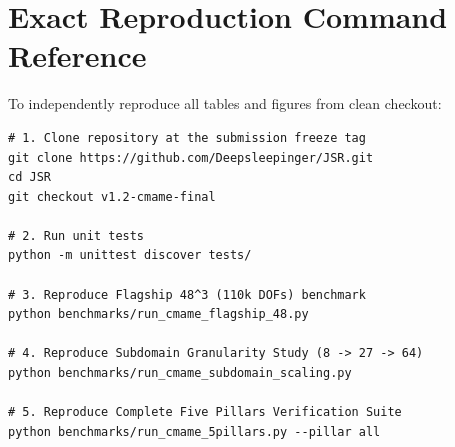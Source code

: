 \documentclass[11pt,a4paper]{article}
\begin{document}
\begin{table}[htbp]
\centering
\small
\caption{Subdomain granularity scaling across $N_{\text{sub}} \in \{8, 27, 64\}$ ($N=32$, 3 time steps).}
\label{tab:supp_granularity}
\end{table}

\section{Exact Reproduction Command Reference}
To independently reproduce all tables and figures from clean checkout:
\begin{verbatim}
# 1. Clone repository at the submission freeze tag
git clone https://github.com/Deepsleepinger/JSR.git
cd JSR
git checkout v1.2-cmame-final

# 2. Run unit tests
python -m unittest discover tests/

# 3. Reproduce Flagship 48^3 (110k DOFs) benchmark
python benchmarks/run_cmame_flagship_48.py

# 4. Reproduce Subdomain Granularity Study (8 -> 27 -> 64)
python benchmarks/run_cmame_subdomain_scaling.py

# 5. Reproduce Complete Five Pillars Verification Suite
python benchmarks/run_cmame_5pillars.py --pillar all
\end{verbatim}
\end{document}
